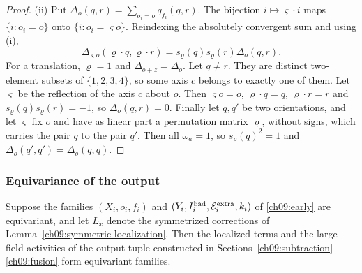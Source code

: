 \begin{proof}
(ii) Put $\Delta_o(q,r)=\sum_{o_i=o}q_{f_i}(q,r)$. The bijection
$i\mapsto\varsigma\cdot i$ maps $\{i:o_i=o\}$ onto
$\{i:o_i=\varsigma o\}$. Reindexing the absolutely convergent sum and
using (i),
\[
 \Delta_{\varsigma o}(\varrho\cdot q,\varrho\cdot r)
     =s_\varrho(q)s_\varrho(r)\Delta_o(q,r).
\]
For a translation, $\varrho=1$ and $\Delta_{o+z}=\Delta_o$. Let
$q\ne r$. They are distinct two-element subsets of $\{1,2,3,4\}$, so
some axis $c$ belongs to exactly one of them. Let $\varsigma$ be the
reflection of the axis $c$ about $o$. Then $\varsigma o=o$,
$\varrho\cdot q=q$, $\varrho\cdot r=r$ and
$s_\varrho(q)s_\varrho(r)=-1$, so $\Delta_o(q,r)=0$. Finally let
$q,q'$ be two orientations, and let $\varsigma$ fix $o$ and have as
linear part a permutation matrix $\varrho$, without signs, which
carries the pair $q$ to the pair $q'$. Then all $\omega_a=1$, so
$s_\varrho(q)^2=1$ and $\Delta_o(q',q')=\Delta_o(q,q)$.
\end{proof}

\subsubsection*{Equivariance of the output}

\begin{proposition}
\label{ch09:output-equivariance}
Suppose the families $(X_i,o_i,f_i)$ and
$(Y_i,I_i^{\rm bad},\mathcal E_i^{\rm extra},k_i)$ of
\eqref{ch09:early} are equivariant, and let $L_x$ denote the
symmetrized corrections of Lemma~\ref{ch09:symmetric-localization}.
Then the localized terms and the large-field activities of the
output tuple constructed in
Sections~\ref{ch09:subtraction}--\ref{ch09:fusion} form equivariant
families.
\end{proposition}

